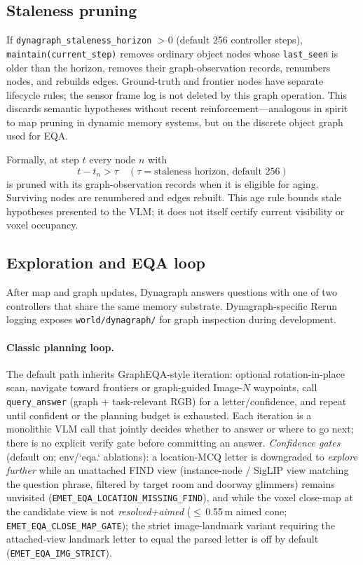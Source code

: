 \subsection{Staleness pruning}
\label{sec:staleness_pruning}

If \texttt{dynagraph\_staleness\_horizon} $> 0$ (default 256 controller steps), \texttt{maintain(current\_step)} removes ordinary object nodes whose \texttt{last\_seen} is older than the horizon, removes their graph-observation records, renumbers nodes, and rebuilds edges. Ground-truth and frontier nodes have separate lifecycle rules; the sensor frame log is not deleted by this graph operation.
This discards semantic hypotheses without recent reinforcement---analogous in spirit to map pruning in dynamic memory systems, but on the discrete object graph used for EQA.

Formally, at step $t$ every node $n$ with
\begin{equation}
  t - t_n > \tau \quad (\tau = \text{staleness horizon, default } 256)
\end{equation}
is pruned with its graph-observation records when it is eligible for aging. Surviving nodes are renumbered and edges rebuilt. This age rule bounds stale hypotheses presented to the VLM; it does not itself certify current visibility or voxel occupancy.

\subsection{Exploration and EQA loop}
\label{sec:eqa_loops}

After map and graph updates, Dynagraph answers questions with one of two controllers that share the same memory substrate.
Dynagraph-specific Rerun logging exposes \texttt{world/dynagraph/} for graph inspection during development.

\paragraph{Classic planning loop.}
The default path inherits GraphEQA-style iteration: optional rotation-in-place scan, navigate toward frontiers or graph-guided Image-$N$ waypoints, call \texttt{query\_answer} (graph + task-relevant RGB) for a letter/confidence, and repeat until confident or the planning budget is exhausted.
Each iteration is a monolithic VLM call that jointly decides whether to answer or where to go next; there is no explicit verify gate before committing an answer.
\emph{Confidence gates} (default on; env/`eqa.` ablations): a location-MCQ letter is downgraded to \emph{explore further} while an unattached FIND view (instance-node / SigLIP view matching the question phrase, filtered by target room and doorway glimmers) remains unvisited (\texttt{EMET\_EQA\_LOCATION\_MISSING\_FIND}), and while the voxel close-map at the candidate view is not \emph{resolved+aimed} ($\le$\,0.55\,m aimed cone; \texttt{EMET\_EQA\_CLOSE\_MAP\_GATE}); the strict image-landmark variant requiring the attached-view landmark letter to equal the parsed letter is off by default (\texttt{EMET\_EQA\_IMG\_STRICT}).

